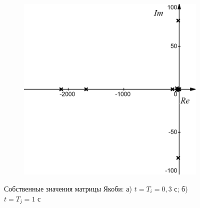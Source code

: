 \begin{figure}[!h]
\begin{subfigure}{.5\textwidth}
	 		\centering\includegraphics[width=.95\textwidth]{png/roots2.png}
	 		\caption{}
	 	\end{subfigure}
	 	\caption{Собственные значения матрицы Якоби: а) $t=T_i=0,3$ с; б) $t=T_j=1$ с}
	 	\label{roots} 
	\end{figure}
	
